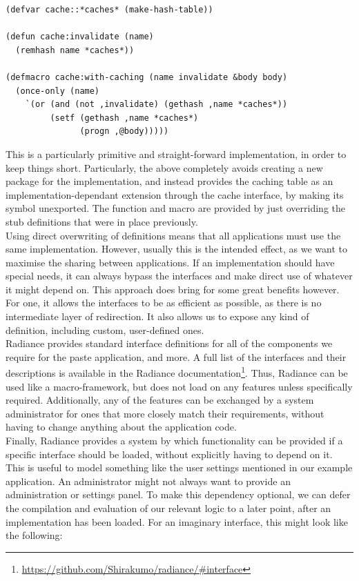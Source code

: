 \documentclass{sig-alternate}
\begin{document}
\begin{verbatim}
(defvar cache::*caches* (make-hash-table))

(defun cache:invalidate (name)
  (remhash name *caches*))

(defmacro cache:with-caching (name invalidate &body body)
  (once-only (name)
    `(or (and (not ,invalidate) (gethash ,name *caches*))
         (setf (gethash ,name *caches*)
               (progn ,@body)))))
\end{verbatim}

This is a particularly primitive and straight-forward implementation, in order to keep things short. Particularly, the above completely avoids creating a new package for the implementation, and instead provides the caching table as an implementation-dependant extension through the cache interface, by making its symbol unexported. The function and macro are provided by just overriding the stub definitions that were in place previously. \\

Using direct overwriting of definitions means that all applications must use the same implementation. However, usually this is the intended effect, as we want to maximise the sharing between applications. If an implementation should have special needs, it can always bypass the interfaces and make direct use of whatever it might depend on. This approach does bring for some great benefits however. For one, it allows the interfaces to be as efficient as possible, as there is no intermediate layer of redirection. It also allows us to expose any kind of definition, including custom, user-defined ones. \\

Radiance provides standard interface definitions for all of the components we require for the paste application, and more. A full list of the interfaces and their descriptions is available in the Radiance documentation\footnote{\url{https://github.com/Shirakumo/radiance/\#interface}}. Thus, Radiance can be used like a macro-framework, but does not load on any features unless specifically required. Additionally, any of the features can be exchanged by a system administrator for ones that more closely match their requirements, without having to change anything about the application code.\\

Finally, Radiance provides a system by which functionality can be provided if a specific interface should be loaded, without explicitly having to depend on it. This is useful to model something like the user settings mentioned in our example application. An administrator might not always want to provide an administration or settings panel. To make this dependency optional, we can defer the compilation and evaluation of our relevant logic to a later point, after an implementation has been loaded. For an imaginary  interface, this might look like the following:
\end{document}
